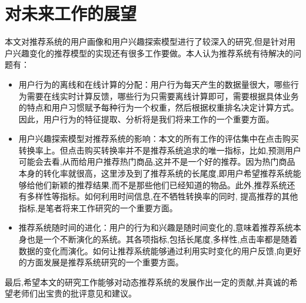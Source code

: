   \section{对未来工作的展望}
  本文对推荐系统的用户画像和用户兴趣探索模型进行了较深入的研究,但是针对用户兴趣变化的推荐模型的实现还有很多工作要做。本人认为推荐系统有待解决的问题有：
    \begin{itemize}
      \item 用户行为的离线和在线计算的分配：用户行为每天产生的数据量很大，哪些行为需要在线实时计算反馈，哪些行为只需要离线计算即可，需要根据具体业务的特点和用户习惯赋予每种行为一个权重，然后根据权重排名决定计算方式。因此，用户行为的特征提取、分析将是我们将来工作的一个重要方面。
      \item 用户兴趣探索模型对推荐系统的影响：本文的所有工作的评估集中在点击购买转换率上。但点击购买转换率并不是推荐系统追求的唯一指标，比如,预测用户可能会去看,从而给用户推荐热门商品,这并不是一个好的推荐。因为热门商品本身的转化率就很高，这里涉及到了推荐系统的长尾度,即用户希望推荐系统能够给他们新颖的推荐结果,而不是那些他们已经知道的物品。此外,推荐系统还有多样性等指标。如何利用时间信息,在不牺牲转换率的同时, 提高推荐的其他指标,是笔者将来工作研究的一个重要方面。
      \item 推荐系统随时间的进化：用户的行为和兴趣是随时间变化的,意味着推荐系统本身也是一个不断演化的系统。其各项指标,包括长尾度,多样性,点击率都是随着数据的变化而演化。如何让推荐系统能够通过利用实时变化的用户反馈,向更好的方面发展是推荐系统研究的一个重要方面。
    \end{itemize}

  最后,希望本文的研究工作能够对动态推荐系统的发展作出一定的贡献,并真诚的希望老师们出宝贵的批评意见和建议。